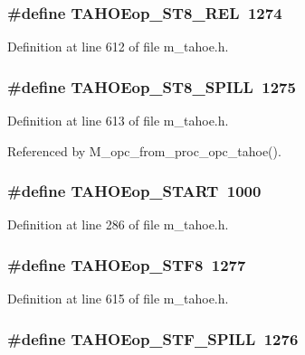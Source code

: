 \subsubsection{\setlength{\rightskip}{0pt plus 5cm}\#define TAHOEop\_\-ST8\_\-REL~1274}\label{m__tahoe_8h_454faea52262c74ba800fb0d3b0fcdf6}




Definition at line 612 of file m\_\-tahoe.h.
\subsubsection{\setlength{\rightskip}{0pt plus 5cm}\#define TAHOEop\_\-ST8\_\-SPILL~1275}\label{m__tahoe_8h_a32352ab13619fffb527ad62c88596e8}




Definition at line 613 of file m\_\-tahoe.h.

Referenced by M\_\-opc\_\-from\_\-proc\_\-opc\_\-tahoe().
\subsubsection{\setlength{\rightskip}{0pt plus 5cm}\#define TAHOEop\_\-START~1000}\label{m__tahoe_8h_a6c30d68189748cf0526e201b1cc2ebd}




Definition at line 286 of file m\_\-tahoe.h.
\subsubsection{\setlength{\rightskip}{0pt plus 5cm}\#define TAHOEop\_\-STF8~1277}\label{m__tahoe_8h_7442c8bc26c87325bc6e9d1441deba6a}




Definition at line 615 of file m\_\-tahoe.h.
\subsubsection{\setlength{\rightskip}{0pt plus 5cm}\#define TAHOEop\_\-STF\_\-SPILL~1276}\label{m__tahoe_8h_f038bb3632041b91b9c3aebea51c4a5c}




